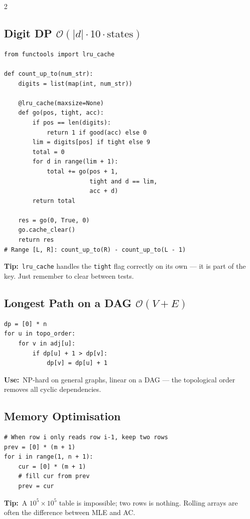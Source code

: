 \documentclass[10pt]{article}
\newcommand{\code}[1]{\texttt{\small #1}}
\newcommand{\sub}[2]{\subsection[#1]{#1\hspace{0.6em}%
  \textnormal{\color{accent2}\small$\mathcal{O}(#2)$}}}
\newcommand{\uses}[1]{{\color{accent2}\footnotesize\textbf{Use:}}~{\footnotesize #1}\par}
\newcommand{\tip}[1]{{\color{tipc}\footnotesize\textbf{Tip:}}~{\footnotesize #1}\par}
\begin{document}
\begin{multicols}{2}
\sub{Digit DP}{|d| \cdot 10 \cdot \text{states}}
\begin{lstlisting}
from functools import lru_cache

def count_up_to(num_str):
    digits = list(map(int, num_str))

    @lru_cache(maxsize=None)
    def go(pos, tight, acc):
        if pos == len(digits):
            return 1 if good(acc) else 0
        lim = digits[pos] if tight else 9
        total = 0
        for d in range(lim + 1):
            total += go(pos + 1,
                        tight and d == lim,
                        acc + d)
        return total

    res = go(0, True, 0)
    go.cache_clear()
    return res
# Range [L, R]: count_up_to(R) - count_up_to(L - 1)
\end{lstlisting}
\tip{\code{lru\_cache} handles the \code{tight} flag correctly on its
own --- it is part of the key. Just remember to clear between tests.}

\sub{Longest Path on a DAG}{V + E}
\begin{lstlisting}
dp = [0] * n
for u in topo_order:
    for v in adj[u]:
        if dp[u] + 1 > dp[v]:
            dp[v] = dp[u] + 1
\end{lstlisting}
\uses{NP-hard on general graphs, linear on a DAG --- the topological
order removes all cyclic dependencies.}

\subsection{Memory Optimisation}
\begin{lstlisting}
# When row i only reads row i-1, keep two rows
prev = [0] * (m + 1)
for i in range(1, n + 1):
    cur = [0] * (m + 1)
    # fill cur from prev
    prev = cur
\end{lstlisting}
\tip{A $10^5 \times 10^5$ table is impossible; two rows is nothing.
Rolling arrays are often the difference between MLE and AC.}

\end{multicols}

\end{document}
